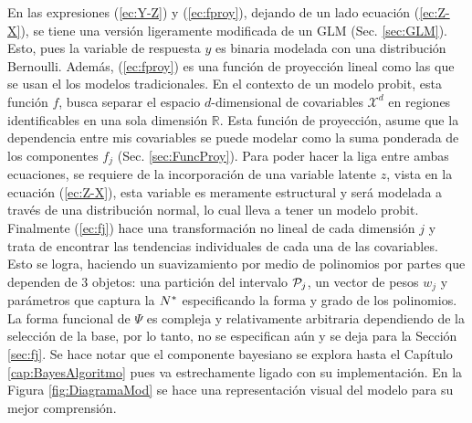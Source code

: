 \documentclass[../Main/Main.tex]{subfiles}
\begin{document}
En las expresiones (\ref{ec:Y-Z}) y (\ref{ec:fproy}), dejando de un lado ecuación (\ref{ec:Z-X}), se tiene una versión ligeramente modificada de un GLM (Sec. \ref{sec:GLM}). Esto, pues la variable de respuesta $y$ es binaria modelada con una distribución Bernoulli. Además, (\ref{ec:fproy}) es una función de proyección lineal como las que se usan el los modelos tradicionales. En el contexto de un modelo probit, esta función $f$, busca separar el espacio $d$-dimensional de covariables $\mathcal{X}^d$ en regiones identificables en una sola dimensión $\mathbb{R}$. Esta función de proyección, asume que la dependencia entre mis covariables se puede modelar como la suma ponderada de los componentes $f_j$ (Sec. \ref{sec:FuncProy}). Para poder hacer la liga entre ambas ecuaciones, se requiere de la incorporación de una variable latente $z$, vista en la ecuación (\ref{ec:Z-X}), esta variable es meramente estructural y será modelada a través de una distribución normal, lo cual lleva a tener un modelo probit. Finalmente (\ref{ec:fj}) hace una transformación no lineal de cada dimensión $j$ y trata de encontrar las tendencias individuales de cada una de las covariables. Esto se logra, haciendo un suavizamiento por medio de polinomios por partes que dependen de 3 objetos: una partición del intervalo $\P_j$, un vector de pesos $w_j$ y parámetros que captura la $\N$ especificando la forma y grado de los polinomios. La forma funcional de $\Psi$ es compleja y relativamente arbitraria dependiendo de la selección de la base, por lo tanto, no se especifican aún y se deja para la Sección \ref{sec:fj}. Se hace notar que el componente bayesiano se explora hasta el Capítulo \ref{cap:BayesAlgoritmo} pues va estrechamente ligado con su implementación.  En la Figura \ref{fig:DiagramaMod} se hace una representación visual del modelo para su mejor comprensión.
\end{document}
